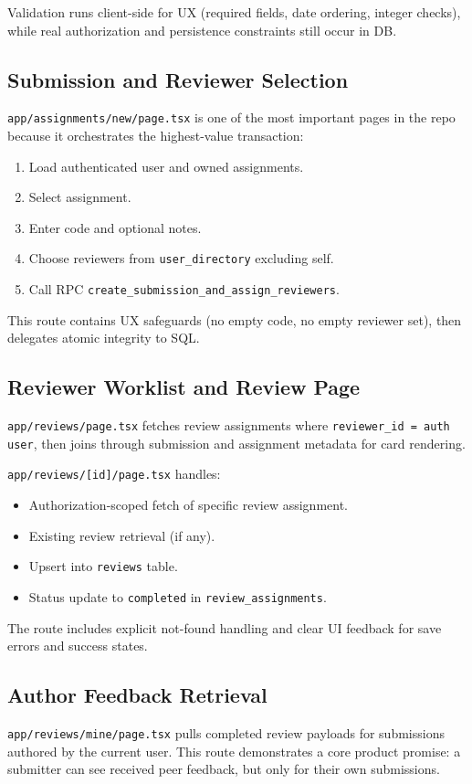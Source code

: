 \documentclass[11pt]{article}
\begin{document}
Validation runs client-side for UX (required fields, date ordering, integer checks), while real authorization and persistence constraints still occur in DB.

\subsection{Submission and Reviewer Selection}
\texttt{app/assignments/new/page.tsx} is one of the most important pages in the repo because it orchestrates the highest-value transaction:
\begin{enumerate}[leftmargin=*]
  \item Load authenticated user and owned assignments.
  \item Select assignment.
  \item Enter code and optional notes.
  \item Choose reviewers from \texttt{user\_directory} excluding self.
  \item Call RPC \texttt{create\_submission\_and\_assign\_reviewers}.
\end{enumerate}

This route contains UX safeguards (no empty code, no empty reviewer set), then delegates atomic integrity to SQL.

\subsection{Reviewer Worklist and Review Page}
\texttt{app/reviews/page.tsx} fetches review assignments where \texttt{reviewer\_id = auth user}, then joins through submission and assignment metadata for card rendering.

\texttt{app/reviews/[id]/page.tsx} handles:
\begin{itemize}[leftmargin=*]
  \item Authorization-scoped fetch of specific review assignment.
  \item Existing review retrieval (if any).
  \item Upsert into \texttt{reviews} table.
  \item Status update to \texttt{completed} in \texttt{review\_assignments}.
\end{itemize}

The route includes explicit not-found handling and clear UI feedback for save errors and success states.

\subsection{Author Feedback Retrieval}
\texttt{app/reviews/mine/page.tsx} pulls completed review payloads for submissions authored by the current user. This route demonstrates a core product promise: a submitter can see received peer feedback, but only for their own submissions.
\end{document}
